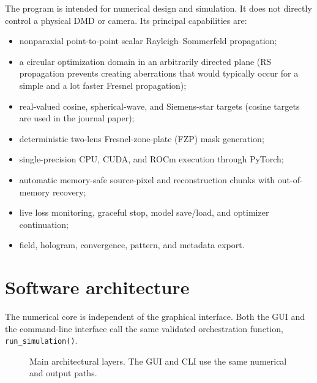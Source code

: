 \documentclass[11pt,a4paper]{article}
\begin{document}
The program is intended for numerical design and simulation. It does not directly control a physical DMD or camera. Its principal capabilities are:
\begin{itemize}
  \item nonparaxial point-to-point scalar Rayleigh--Sommerfeld propagation; 
  \item a circular optimization domain in an arbitrarily directed plane  (RS propagation prevents creating aberrations that would typically occur for a simple and a lot faster Fresnel propagation);
  \item real-valued cosine, spherical-wave, and Siemens-star targets (cosine targets are used in the journal paper);
  \item deterministic two-lens Fresnel-zone-plate (FZP) mask generation;
  \item single-precision CPU, CUDA, and ROCm execution through PyTorch;
  \item automatic memory-safe source-pixel and reconstruction chunks with out-of-memory recovery;
  \item live loss monitoring, graceful stop, model save/load, and optimizer continuation;
  \item field, hologram, convergence, pattern, and metadata export.
\end{itemize}

\section{Software architecture}
The numerical core is independent of the graphical interface. Both the GUI and the command-line interface call the same validated orchestration function, \texttt{run\_simulation()}.

\begin{figure}[H]
\centering
{}
\caption{Main architectural layers. The GUI and CLI use the same numerical and output paths.}
\label{fig:architecture}
\end{figure}
\end{document}
